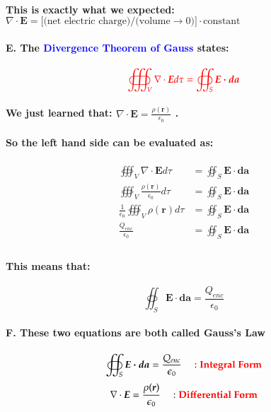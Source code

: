\documentclass{article}
\begin{document}
\paragraph{This is exactly what we expected:
\\$\nabla\cdot \boldsymbol{E}=\text{[(net electric charge)/(volume}\longrightarrow0)]\cdot \text{constant}$}
\paragraph{E. The \textcolor{blue}{Divergence Theorem of Gauss} states:}
\begin{equation*}
    \textcolor{red}{\oiiint_V \nabla \cdot \boldsymbol{E}d\tau=\oiint_S \boldsymbol{E\cdot da}}
\end{equation*}
\paragraph{We just learned that: $\nabla \cdot \boldsymbol{E}=\frac{\rho(\boldsymbol{r})}{\epsilon_0}$ .}
\paragraph{So the left hand side can be evaluated as:}
\begin{align*}
    \oiiint_V \nabla \cdot \boldsymbol{E}d\tau&=\oiint_S \boldsymbol{E\cdot da}\\
\oiiint_V \frac{\rho(\boldsymbol{r})}{\epsilon_0}d\tau&=\oiint_S \boldsymbol{E\cdot da}\\
    \frac{1}{\epsilon_0}\oiiint_V \rho(\boldsymbol{r})d\tau&=\oiint_S \boldsymbol{E\cdot da}\\
    \frac{Q_{enc}}{\epsilon_0}&=\oiint_S \boldsymbol{E\cdot da}\\
\end{align*}
\paragraph{This means that:}
\begin{equation*}
    \oiint_S\boldsymbol{E\cdot da}=\frac{Q_{enc}}{\epsilon_0}
\end{equation*}
\paragraph{F. These two equations are both called Gauss's Law}
\begin{equation*}
    \oiint_S \boldsymbol{E\cdot da}=\frac{Q_{enc}}{\epsilon_0}\quad :\textbf{\textcolor{red}{Integral Form}}
\end{equation*}
\begin{equation*}
    \nabla \cdot \boldsymbol{E}=\frac{\rho(\boldsymbol{r})}{\epsilon_0}\quad : \textbf{\textcolor{red}{Differential Form}}
\end{equation*}
\end{document}

